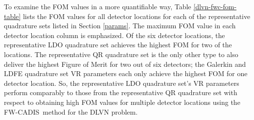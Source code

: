 \documentclass{article} %
\newcommand{\fwc}{\mbox{FW-CADIS}}
\begin{document}
To examine the FOM values in a more quantifiable way, Table 
\ref{dlvn-fwc-fom-table} lists the FOM values for all detector locations for
each of the representative quadrature sets listed in Section \ref{params}.
The maximum FOM value in each detector location column is emphasized. Of the
six detector locations, the representative LDO quadrature set achieves the
highest FOM for two of the locations. The representative QR quadrature set is
the only other type to also deliver the highest Figure of Merit for two out of
six detectors; the Galerkin and LDFE quadrature set VR parameters each
only achieve the highest FOM for one detector location. So, the representative
LDO quadrature set's VR parameters perform comparably to those from the
representative QR quadrature set with respect to obtaining high FOM values for
multiple detector locations using the \fwc\ method for the DLVN problem.
\end{document}
